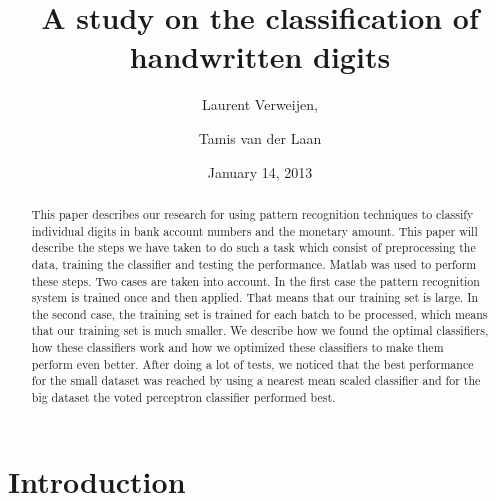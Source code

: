 \documentclass[%
        compressed,
        final,
        notitlepage,
        narroweqnarray,
        inline,
        twoside,
        ]{ieee}
\title{A study on the classification of handwritten digits}
\author{Laurent Verweijen, \and Tamis van der Laan}
\date{January 14, 2013}
\begin{document}
\maketitle

\begin{abstract}
This paper describes our research for using pattern recognition techniques to
classify individual digits in bank account numbers and the monetary amount. This
paper will describe the steps we have taken to do such a task which consist of
preprocessing the data, training the classifier and testing the performance.
Matlab was used to perform these steps. Two cases are taken into account. In the
first case the pattern recognition system is trained once and then applied.
That means that our training set is large. In the second case, the training set
is trained for each batch to be processed, which means that our training set is
much smaller. We describe how we found the optimal classifiers, how these
classifiers work and how we optimized these classifiers to make them perform
even better. After doing a lot of tests, we noticed that the best performance
for the small dataset was reached by using a nearest mean scaled classifier and
for the big dataset the voted perceptron classifier performed best. 
\end{abstract}

\section{Introduction}
\end{document}
